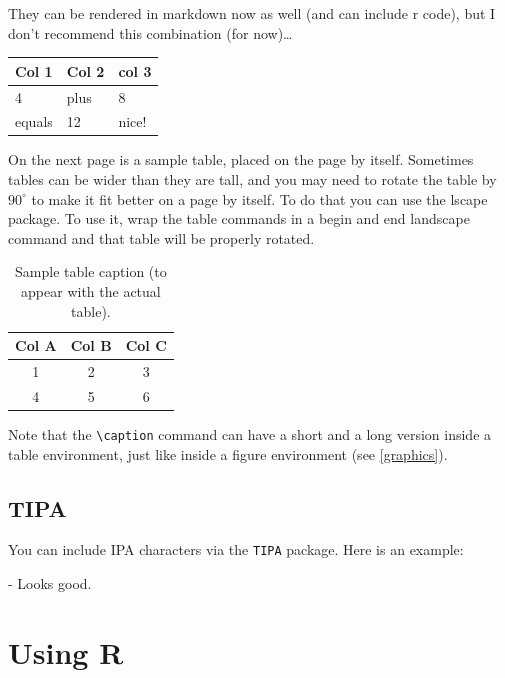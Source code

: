 \documentclass[11pt,report]{uncdissertation}
\begin{document}
They can be rendered in markdown now as well (and can include r code),
but I don't recommend this combination (for now)\ldots

\begin{longtable}[c]{@{}lll@{}}
\toprule
Col 1 & Col 2 & col 3\tabularnewline
\midrule
\endhead
4 & plus & 8\tabularnewline
equals & 12 & nice!\tabularnewline
\bottomrule
\end{longtable}

On the next page is a sample table, placed on the page by itself.
Sometimes tables can be wider than they are tall, and you may need to
rotate the table by \(90^{\circ}\) to make it fit better on a page by
itself. To do that you can use the lscape package. To use it, wrap the
table commands in a begin and end landscape command and that table will
be properly rotated.

\begin{landscape}
\begin{table}[p!]
  \begin{center}
  \caption[Short table caption here]{Sample table caption (to appear with the actual table). \label{sampletable}}
  \vspace{0.3in}
    \begin{tabular}{ccc}
      \hline 
      \hline
      Col A & Col B & Col C \\
      \hline
      1     & 2     & 3     \\
      4     & 5     & 6     \\
      \hline
    \end{tabular}
  \end{center}
\end{table}
\end{landscape}

Note that the \verb=\caption= command can have a short and a long
version inside a table environment, just like inside a figure
environment (see \ref{graphics}).

\section{\texorpdfstring{TIPA\label{using IPA}}{TIPA}}\label{tipa}

You can include IPA characters via the \texttt{TIPA} package. Here is an
example:

\textipa{[Sip]-[SIp]} - Looks good.

\chapter{Using R\label{rcode}}
\end{document}
